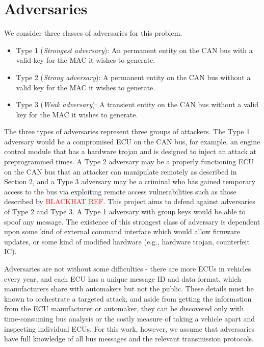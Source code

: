 \section{Adversaries}
\label{adversary}

We consider three classes of adversaries for this problem.

\begin{itemize}
	\item Type 1 (\textit{Strongest adversary}): An permanent entity on the CAN bus with a valid key for the MAC it wishes to generate.
	\item Type 2 (\textit{Strong adversary}): A permanent entity on the CAN bus without a valid key for the MAC it wishes to generate.
	\item Type 3 (\textit{Weak adversary}): A transient entity on the CAN bus without a valid key for the MAC it wishes to generate.
\end{itemize}

The three types of adversaries represent three groups of attackers. The Type 1 adversary would be a compromised ECU on the CAN bus, for example, an engine control module that has a hardware trojan and is designed to inject an attack at preprogrammed times. A Type 2 adversary may be a properly functioning ECU on the CAN bus that an attacker can manipulate remotely as described in Section 2, and a Type 3 adversary may be a criminal who has gained temporary access to the bus via exploiting remote access vulnerabilities such as those described by \textcolor{red}{BLACKHAT REF}. This project aims to defend against adversaries of Type 2 and Type 3. A Type 1 adversary with group keys would be able to spoof any message. The existence of this strongest class of adversary is dependent upon some kind of external command interface which would allow firmware updates, or some kind of modified hardware (e.g., hardware trojan, counterfeit IC).

Adversaries are not without some difficulties - there are more ECUs in vehicles every year, and each ECU has a unique message ID and data format, which manufacturers share with automakers but not the public. These details must be known to orchestrate a targeted attack, and aside from getting the information from the ECU manufacturer or automaker, they can be discovered only with time-consuming bus analysis or the costly measure of taking a vehicle apart and inspecting individual ECUs. For this work, however, we assume that adversaries have full knowledge of all bus messages and the relevant transmission protocols.

